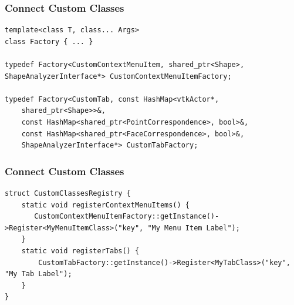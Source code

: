\documentclass[compress]{beamer}
\begin{document}
\begin{frame}[fragile]
\frametitle{Connect Custom Classes}

\begin{lstlisting}
template<class T, class... Args>
class Factory { ... }

typedef Factory<CustomContextMenuItem, shared_ptr<Shape>, ShapeAnalyzerInterface*> CustomContextMenuItemFactory;

typedef Factory<CustomTab, const HashMap<vtkActor*, 
    shared_ptr<Shape>>&, 
    const HashMap<shared_ptr<PointCorrespondence>, bool>&, 
    const HashMap<shared_ptr<FaceCorrespondence>, bool>&, 
    ShapeAnalyzerInterface*> CustomTabFactory;
\end{lstlisting}

\end{frame}

\begin{frame}[fragile]
\frametitle{Connect Custom Classes}

\begin{lstlisting}
struct CustomClassesRegistry {
    static void registerContextMenuItems() {
       CustomContextMenuItemFactory::getInstance()->Register<MyMenuItemClass>("key", "My Menu Item Label");
    }
    static void registerTabs() {
        CustomTabFactory::getInstance()->Register<MyTabClass>("key", "My Tab Label");
    }
}
\end{lstlisting}
  
\end{frame}
\end{document}
